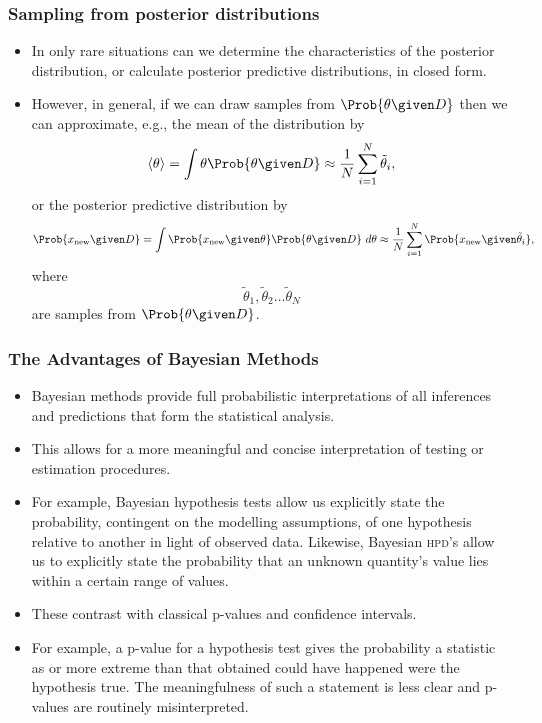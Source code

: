 \documentclass{slides}
\begin{document}
\begin{frame}
	\frametitle{Sampling from posterior distributions}
	\begin{itemize}

		\item In only rare situations can we determine the characteristics of the posterior distribution, or calculate posterior predictive distributions, in closed form.
		\item However, in general, if we can draw samples from $\Prob{\theta\given D}$ then we can approximate, e.g., the mean of the distribution by
			\[
				\langle\theta\rangle = \int\theta\Prob{\theta\given D} \approx \frac{1}{N} \sum_{i=1}^N \tilde{\theta}_i,
			\]
		or the posterior predictive distribution by 
		\[
			\Prob{x_{\text{new}} \given D} = \int\Prob{x_{\text{new}}\given\theta}\Prob{\theta\given D}\ d\theta
			\approx \frac{1}{N} \sum_{i=1}^N \Prob{x_{\text{new}}\given\tilde{\theta}_i},
		\]
		where \[\tilde{\theta}_1, \tilde{\theta}_2 \ldots \tilde{\theta}_N\] are samples from $\Prob{\theta\given D}$.
	\end{itemize}
\end{frame}
\begin{frame}
	\frametitle{The Advantages of Bayesian Methods}
	\begin{itemize}	
		\item Bayesian methods provide full probabilistic interpretations of all inferences
and predictions that form the statistical analysis. 
\item This allows for a more meaningful and concise interpretation of testing or estimation procedures.  
\item For example, Bayesian hypothesis
tests allow us explicitly state the probability, contingent on the modelling
assumptions, of one hypothesis relative to another in light of observed data.
Likewise, Bayesian \textsc{hpd}'s allow us to explicitly state the probability
that an unknown quantity's value lies within a certain range of values. 
\item These contrast with classical p-values and
confidence intervals.  
\item For example, a p-value for a hypothesis test gives the
probability a statistic as or more extreme than that obtained could have
happened were the hypothesis true. The meaningfulness of such a statement is
less clear and p-values are
routinely misinterpreted. 
	\end{itemize}
\end{frame}
\end{document}
